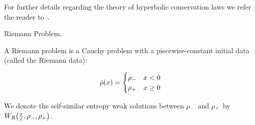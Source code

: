 For further details regarding the theory of hyperbolic conservation laws we refer the reader to~\cite{garavello2006traffic,Evans1998}.

%
%
%
%
%
\begin{defn}
	\label{def:Riemann-Problem}Riemann Problem.
	
	A Riemann problem is a Cauchy problem with a piecewise-constant initial data (called the Riemann data):
	
	\[
		\bar{\rho}(x)=\begin{cases}
		\rho_{-} & x<0\\
		\rho_{+} & x\ge 0
		\end{cases}
	\]
\end{defn}
We denote the self-similar entropy weak solutions between $\rho_{-}$ and $\rho_{+}$ by $\ss{\frac{x}{t}}{\cvar_{-}}{\cvar_{+}}$.


